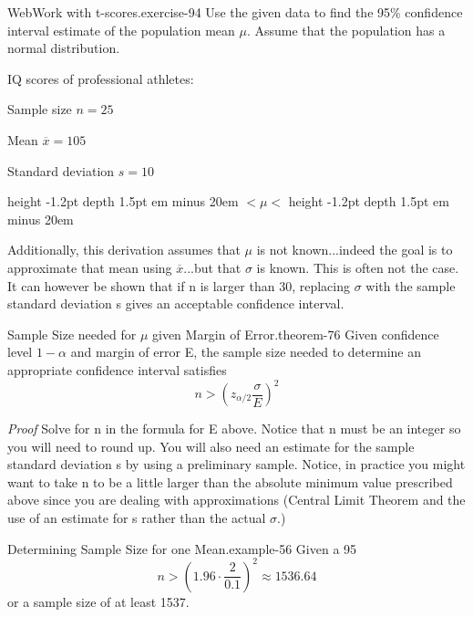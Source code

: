 \documentclass[10pt,]{book}
\makeatletter
\newcommand{\fillin}[1]{\leavevmode\leaders\vrule height -1.2pt depth 1.5pt \hskip #1em minus #1em \null}
\renewcommand*{\proofname}{Proof}
\renewenvironment{proof}[1][\proofname]{\par
  \pushQED{\qed}%
  \normalfont \topsep6\p@\@plus6\p@\relax
  \trivlist
  \item\relax
    {\itshape
    #1\@addpunct{.}}\hspace\labelsep\ignorespaces
}{%
  \popQED\endtrivlist\@endpefalse
}
\numberwithin{equation}{section}
\newcommand{\lt}{<}
\newcommand{\gt}{>}
\makeatother
\begin{document}
\begin{inlineexercise}{WebWork with t-scores.}{exercise-94}%
\hypertarget{p-1396}{}%
Use the given data to find the 95\% confidence interval estimate of the population mean \(\mu\). Assume that the population has a normal distribution.%
\par
\hypertarget{p-1397}{}%
IQ scores of professional athletes:%
\par
\hypertarget{p-1398}{}%
Sample size \(n = 25\)%
\par
\hypertarget{p-1399}{}%
Mean \(\overline{x} = 105\)%
\par
\hypertarget{p-1400}{}%
Standard deviation \(s  = 10\)%
\par
\hypertarget{p-1401}{}%
 \fillin{20} \(\lt  \mu \lt \)  \fillin{20}%
\end{inlineexercise}
%
\par
\hypertarget{p-1402}{}%
Additionally, this derivation assumes that \(\mu\) is not known...indeed the goal is to approximate that mean using \(\overline{x}\)...but that \(\sigma\) is known. This is often not the case. It can however be shown that if n is larger than 30, replacing \(\sigma\) with the sample standard deviation s gives an acceptable confidence interval.%
\begin{theorem}{Sample Size needed for \(\mu\) given Margin of Error.}{}{theorem-76}%
\hypertarget{p-1403}{}%
Given confidence level \(1-\alpha\) and margin of error E, the sample size needed to determine an appropriate confidence interval satisfies%
\begin{equation*}
n \gt \left ( z_{\alpha /2} \frac{\sigma}{E} \right )^2
\end{equation*}
%
\end{theorem}
\begin{proof}\hypertarget{proof-76}{}
\hypertarget{p-1404}{}%
Solve for n in the formula for E above. Notice that n must be an integer so you will need to round up. You will also need an estimate for the sample standard deviation s by using a preliminary sample.%
\end{proof}
\hypertarget{p-1405}{}%
Notice, in practice you might want to take n to be a little larger than the absolute minimum value prescribed above since you are dealing with approximations (Central Limit Theorem and the use of an estimate for s rather than the actual \(\sigma\).)%
\begin{example}{Determining Sample Size for one Mean.}{example-56}%
\hypertarget{p-1406}{}%
Given a 95%
\begin{equation*}
n \gt \left ( 1.96 \cdot \frac{2}{0.1} \right )^2 \approx 1536.64
\end{equation*}
or a sample size of at least 1537.%
\end{example}
%
%
\typeout{************************************************}
\typeout{************************************************}
%
\end{document}
